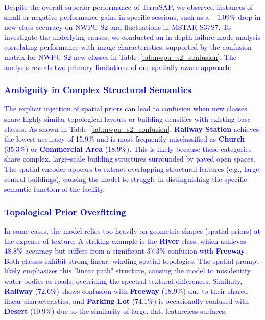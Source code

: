 ﻿\documentclass[letterpaper,journal]{IEEEtran}
\begin{document}
\textcolor{blue}{Despite the overall superior performance of TerraSAP, we observed instances of small or negative performance gains in specific sessions, such as a $-1.09\%$ drop in new class accuracy on NWPU S2 and fluctuations in MSTAR S3/S7. To investigate the underlying causes, we conducted an in-depth failure-mode analysis correlating performance with image characteristics, supported by the confusion matrix for NWPU S2 new classes in Table~\ref{tab:nwpu_s2_confusion}. The analysis reveals two primary limitations of our spatially-aware approach:}

\subsubsection{\textcolor{blue}{Ambiguity in Complex Structural Semantics}}
\textcolor{blue}{The explicit injection of spatial priors can lead to confusion when new classes share highly similar topological layouts or building densities with existing base classes. As shown in Table~\ref{tab:nwpu_s2_confusion}, \textbf{Railway Station} achieves the lowest accuracy of 15.9\% and is most frequently misclassified as \textbf{Church} (35.3\%) or \textbf{Commercial Area} (18.9\%). This is likely because these categories share complex, large-scale building structures surrounded by paved open spaces. The spatial encoder appears to extract overlapping structural features (e.g., large central buildings), causing the model to struggle in distinguishing the specific semantic function of the facility.}

\subsubsection{\textcolor{blue}{Topological Prior Overfitting}}
\textcolor{blue}{In some cases, the model relies too heavily on geometric shapes (spatial priors) at the expense of texture. A striking example is the \textbf{River} class, which achieves 48.8\% accuracy but suffers from a significant 37.3\% confusion with \textbf{Freeway}. Both classes exhibit strong linear, winding spatial topologies. The spatial prompt likely emphasizes this "linear path" structure, causing the model to misidentify water bodies as roads, overriding the spectral textural differences. Similarly, \textbf{Railway} (72.6\%) shows confusion with \textbf{Freeway} (18.9\%) due to their shared linear characteristics, and \textbf{Parking Lot} (74.1\%) is occasionally confused with \textbf{Desert} (10.9\%) due to the similarity of large, flat, featureless surfaces.}
\end{document}

